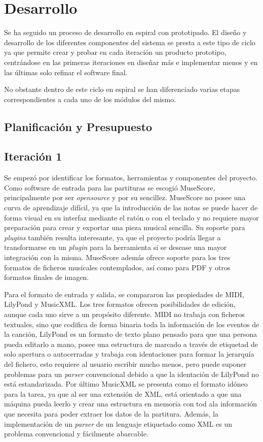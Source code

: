 \chapter{Desarrollo}
\minitoc
\label{chap:desarrollo}
Se ha seguido un proceso de desarrollo en espiral con prototipado. El diseño y desarrollo de los diferentes componentes del sistema se presta a este tipo de ciclo ya que permite crear y probar en cada iteración un producto prototipo, centrándose en las primeras iteraciones en diseñar más e implementar menos y en las últimas solo refinar el software final.

No obstante dentro de este ciclo en espiral se han diferenciado varias etapas correspondientes a cada uno de los módulos del mismo.

\section{Planificación y Presupuesto}

\section{Iteración 1}
Se empezó por identificar los formatos, herramientas y componentes del proyecto. Como software de entrada para las partituras se escogió MuseScore, principalmente por ser \textit{opensource} y por su sencillez. MuseScore no posee una curva de aprendizaje difícil, ya que la introducción de las notas se puede hacer de forma visual en su interfaz mediante el ratón o con el teclado y no requiere mayor preparación para crear y exportar una pieza musical sencilla. Su soporte para \textit{plugins} también resulta interesante, ya que el proyecto podría llegar a transformarse en un \textit{plugin} para la herramienta si se desease una mayor integración con la misma. MuseScore además ofrece soporte para los tres formatos de ficheros musicales contemplados, así como para PDF y otros formatos finales de imagen.

Para el formato de entrada y salida, se compararon las propiedades de MIDI, LilyPond y MusicXML. Los tres formatos ofrecen posibilidades de edición, aunque cada uno sirve a un propósito diferente. MIDI no trabaja con ficheros textuales, sino que codifica de forma binaria toda la información de los eventos de la canción, LilyPond es un formato de texto plano pensado para que una persona pueda editarlo a mano, posee una estructura de marcado a través de etiquetad de solo apertura o autocerradas y trabaja con identaciones para formar la jerarquía del fichero, esto requiere al usuario escribir mucho menos, pero puede suponer problemas para un \textit{parser} convencional debido a que la identación de LilyPond no está estandarizada. Por último MusicXML se presenta como el formato idóneo para la tarea, ya que al ser una extensión de XML, está orientado a que una máquina pueda leerlo y crear una estructura en memoria con tod ala información que necesita para poder extraer los datos de la partitura. Además, la implementación de un \textit{parser} de un lenguaje etiquetado como XML es un problema convencional y fácilmente abarcable.

